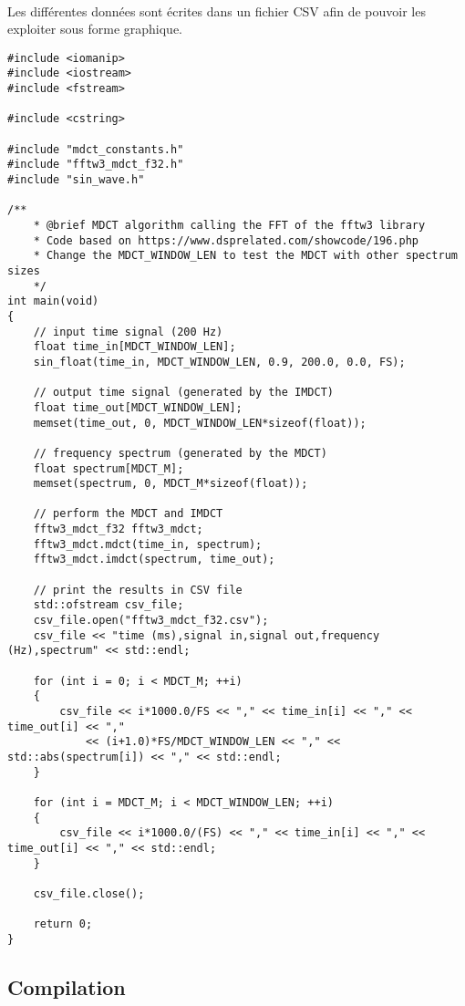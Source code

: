 \documentclass{article}
\begin{document}
\paragraph{}
Les différentes données sont écrites dans un fichier CSV afin de pouvoir les exploiter sous forme graphique.
\lstset{language=C++}
\begin{lstlisting}
#include <iomanip>
#include <iostream>
#include <fstream>

#include <cstring>

#include "mdct_constants.h"
#include "fftw3_mdct_f32.h"
#include "sin_wave.h"

/**
    * @brief MDCT algorithm calling the FFT of the fftw3 library
    * Code based on https://www.dsprelated.com/showcode/196.php
    * Change the MDCT_WINDOW_LEN to test the MDCT with other spectrum sizes
    */
int main(void)
{
    // input time signal (200 Hz)
    float time_in[MDCT_WINDOW_LEN];
    sin_float(time_in, MDCT_WINDOW_LEN, 0.9, 200.0, 0.0, FS);

    // output time signal (generated by the IMDCT)
    float time_out[MDCT_WINDOW_LEN];
    memset(time_out, 0, MDCT_WINDOW_LEN*sizeof(float));

    // frequency spectrum (generated by the MDCT)
    float spectrum[MDCT_M];
    memset(spectrum, 0, MDCT_M*sizeof(float));

    // perform the MDCT and IMDCT
    fftw3_mdct_f32 fftw3_mdct;
    fftw3_mdct.mdct(time_in, spectrum);
    fftw3_mdct.imdct(spectrum, time_out);

    // print the results in CSV file
    std::ofstream csv_file;
    csv_file.open("fftw3_mdct_f32.csv");
    csv_file << "time (ms),signal in,signal out,frequency (Hz),spectrum" << std::endl;

    for (int i = 0; i < MDCT_M; ++i)
    {
        csv_file << i*1000.0/FS << "," << time_in[i] << "," << time_out[i] << ","
            << (i+1.0)*FS/MDCT_WINDOW_LEN << "," << std::abs(spectrum[i]) << "," << std::endl;
    }

    for (int i = MDCT_M; i < MDCT_WINDOW_LEN; ++i)
    {
        csv_file << i*1000.0/(FS) << "," << time_in[i] << "," << time_out[i] << "," << std::endl;
    }

    csv_file.close();

    return 0;
}
\end{lstlisting}

\subsection{Compilation}\label{app:fftw3_example_compilation}
\end{document}
